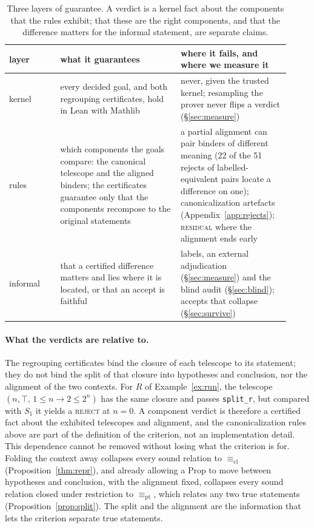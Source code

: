 \documentclass[10pt]{article}
\theoremstyle{definition}
\newcommand{\Ecl}{\mathrel{\equiv_{\mathrm{cl}}}}
\newcommand{\Epi}{\mathrel{\equiv_{\mathrm{pt}}}}
\newcommand{\V}[1]{\textsc{#1}}
\begin{document}
\begin{table}[t]
\centering\small
\begin{tabular}{p{0.17\linewidth}p{0.4\linewidth}p{0.35\linewidth}}
\toprule
layer & what it guarantees & where it fails, and where we measure it\\
\midrule
kernel & every decided goal, and both regrouping certificates, hold in Lean with Mathlib & never,
given the trusted kernel; resampling the prover never flips a verdict (\S\ref{sec:measure})\\
rules & which components the goals compare: the canonical telescope and the aligned binders; the
certificates guarantee only that the components recompose to the original statements & a partial
alignment can pair binders of different meaning (22 of the 51 rejects of labelled-equivalent pairs locate a difference on one);
canonicalization artefacts (Appendix~\ref{app:rejects}); \V{residual} where the alignment ends early\\
informal & that a certified difference matters and lies where it is located, or that an accept is faithful & labels, an external adjudication (\S\ref{sec:measure}) and the
blind audit (\S\ref{sec:blind}); accepts that collapse (\S\ref{sec:survive})\\
\bottomrule
\end{tabular}
\caption{Three layers of guarantee. A verdict is a kernel fact about the components that the
rules exhibit; that these are the right components, and that the difference matters for the
informal statement, are separate claims.}
\label{tab:layers}
\end{table}

\paragraph{What the verdicts are relative to.} The regrouping certificates bind the closure of
each telescope to its statement; they do not bind the split of that closure into hypotheses and
conclusion, nor the alignment of the two contexts. For $R$ of Example~\ref{ex:run}, the telescope
$(n,\top,\,1\le n\to 2\le 2^n)$ has the same closure and passes \texttt{split\_r}, but compared
with $S_1$ it yields a \V{reject} at $n=0$. A component verdict is therefore a certified fact about
the exhibited telescopes and alignment, and the canonicalization rules above are part of the
definition of the criterion, not an implementation detail. This dependence cannot be removed
without losing what the criterion is for. Folding the context away collapses every sound relation
to $\Ecl$ (Proposition~\ref{thm:repr}), and already allowing a Prop to move between hypotheses and
conclusion, with the alignment fixed, collapses every sound relation closed under restriction to
$\Epi$, which relates any two true statements (Proposition~\ref{prop:split}). The split and the
alignment are the information that lets the criterion separate true statements.
\end{document}
